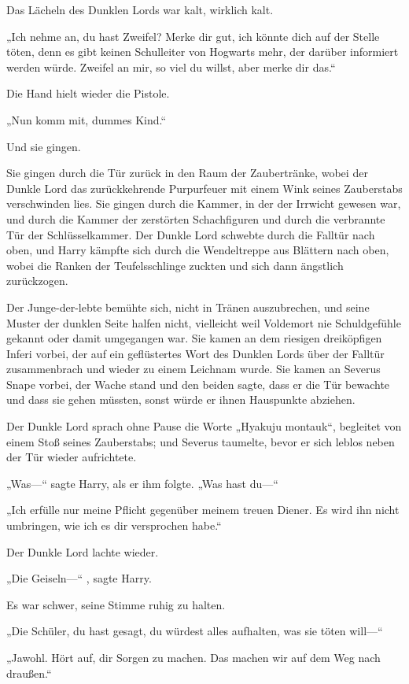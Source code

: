 {Das Lächeln des Dunklen Lords war kalt, wirklich kalt.

„Ich nehme an, du hast Zweifel? Merke dir gut, ich könnte dich auf der Stelle töten, denn es gibt keinen Schulleiter von Hogwarts mehr, der darüber informiert werden würde. Zweifel an mir, so viel du willst, aber merke dir das.“

Die Hand hielt wieder die Pistole.

„Nun komm mit, dummes Kind.“

Und sie gingen.

Sie gingen durch die Tür zurück in den Raum der Zaubertränke, wobei der Dunkle Lord das zurückkehrende Purpurfeuer mit einem Wink seines Zauberstabs verschwinden lies. Sie gingen durch die Kammer, in der der Irrwicht gewesen war, und durch die Kammer der zerstörten Schachfiguren und durch die verbrannte Tür der Schlüsselkammer. Der Dunkle Lord schwebte durch die Falltür nach oben, und Harry kämpfte sich durch die Wendeltreppe aus Blättern nach oben, wobei die Ranken der Teufelsschlinge zuckten und sich dann ängstlich zurückzogen.

Der Junge-der-lebte bemühte sich, nicht in Tränen auszubrechen, und seine Muster der dunklen Seite halfen nicht, vielleicht weil Voldemort nie Schuldgefühle gekannt oder damit umgegangen war. Sie kamen an dem riesigen dreiköpfigen Inferi vorbei, der auf ein geflüstertes Wort des Dunklen Lords über der Falltür zusammenbrach und wieder zu einem Leichnam wurde. Sie kamen an Severus Snape vorbei, der Wache stand und den beiden sagte, dass er die Tür bewachte und dass sie gehen müssten, sonst würde er ihnen Hauspunkte abziehen.

Der Dunkle Lord sprach ohne Pause die Worte „Hyakuju montauk“, begleitet von einem Stoß seines Zauberstabs; und Severus taumelte, bevor er sich leblos neben der Tür wieder aufrichtete.

„Was—“ sagte Harry, als er ihm folgte. „Was hast du—“

„Ich erfülle nur meine Pflicht gegenüber meinem treuen Diener. Es wird ihn nicht umbringen, wie ich es dir versprochen habe.“

Der Dunkle Lord lachte wieder.

„Die Geiseln—“ , sagte Harry.

Es war schwer, seine Stimme ruhig zu halten.

„Die Schüler, du hast gesagt, du würdest alles aufhalten, was sie töten will—“

„Jawohl. Hört auf, dir Sorgen zu machen. Das machen wir auf dem Weg nach draußen.“

}
